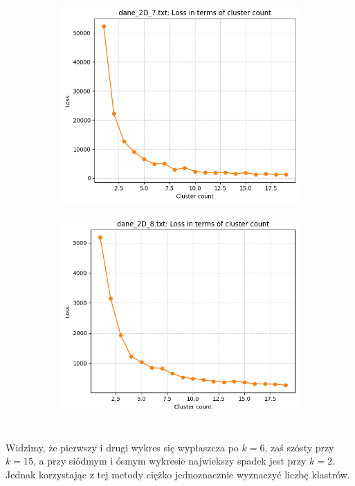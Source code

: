 \documentclass[polish,12pt,a4paper]{extarticle}
\begin{document}
\begin{figure}[h!]
    \hfill
    \vspace{}
    \begin{subfigure}[b]{0.30\textwidth}
        \includegraphics[width=\linewidth]{img/elbow/data7.png}
        \captionsetup{labelformat=empty}
    \end{subfigure}
    \begin{subfigure}[b]{0.30\textwidth}
        \includegraphics[width=\linewidth]{img/elbow/data8.png}
        \captionsetup{labelformat=empty}
    \end{subfigure}
    \label{fig:data_grid}
\end{figure} \\
\noindent Widzimy, że pierwszy i drugi wykres się wypłaszcza po $k = 6$, zaś szósty przy $k = 15$, a przy siódmym i ósmym wykresie najwiekszy spadek jest przy $k = 2$. Jednak korzystając z tej metody ciężko jednoznacznie wyznaczyć liczbę klastrów.
\end{document}
